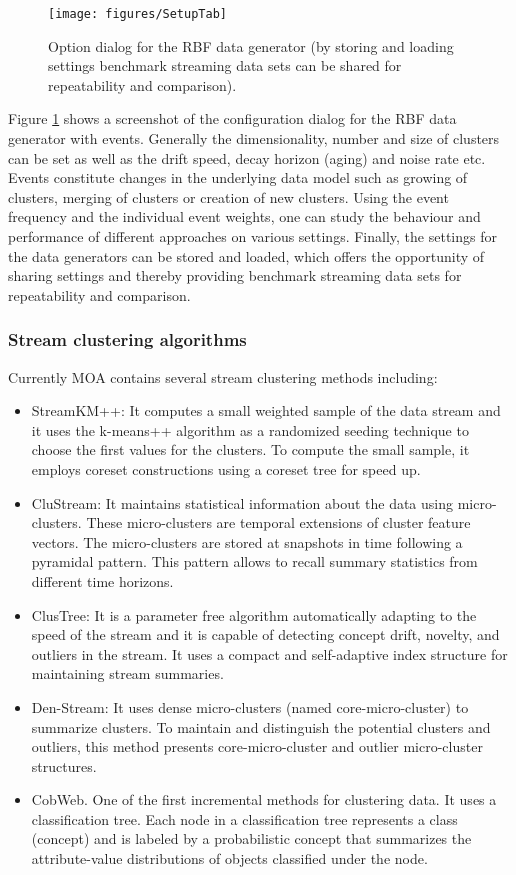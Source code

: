 \documentclass[a4paper,12pt,twoside]{book}
\begin{document}
\begin{figure}[t]
	\centering
		\texttt{[image: figures/SetupTab]}
	\caption{Option dialog for the RBF data generator (by storing and loading settings benchmark streaming data sets can be shared for repeatability and comparison).}
	\label{fig:framework}
\end{figure}
Figure \ref{fig:framework} shows a screenshot of the configuration dialog for the RBF data generator with events. 
Generally the dimensionality, number and size of clusters can be set as well as the drift speed, decay horizon (aging) and noise rate etc.
 Events constitute changes in the underlying data model such as growing of clusters, merging of clusters or creation of new clusters. 
Using the event frequency and the individual event weights, one can study the behaviour and performance of different approaches on various settings. 
Finally, the settings for the data generators can be stored and loaded, which offers the opportunity of sharing settings and thereby providing benchmark streaming data 
sets for repeatability and comparison. 

\subsubsection{Stream clustering algorithms}
\label{sec:algos}

Currently MOA contains several stream clustering methods including:

\begin{itemize}
	\item StreamKM++: It computes a small weighted sample of the data stream
	 and it uses the k-means++ algorithm as a randomized seeding technique to choose the 
	 first values for the clusters. To compute the small sample, it employs coreset constructions
	 using a coreset tree for speed up. 
	\item CluStream: It maintains statistical information about the data using micro-clusters. These micro-clusters are temporal extensions of cluster feature vectors. The 
	micro-clusters are stored at snapshots in time following a pyramidal pattern. This pattern 
	allows to recall summary statistics from different time horizons. 
	\item ClusTree: It is a parameter free algorithm automatically adapting to the speed of the stream and it is capable of detecting concept drift, novelty, and outliers in the stream. It uses a compact and self-adaptive index structure for maintaining stream summaries.
	\item Den-Stream: It uses dense micro-clusters (named core-micro-cluster) 
	to summarize clusters. To maintain and distinguish the potential clusters and outliers, 
	this method presents core-micro-cluster and outlier micro-cluster structures.
	  \item CobWeb. One of the first incremental methods for clustering data. 
	  It uses a classification tree. Each node in a classification tree represents a class (concept)
	   and is labeled by a probabilistic concept that summarizes the attribute-value distributions
	    of objects classified under the node. 
\end{itemize}
\end{document}
